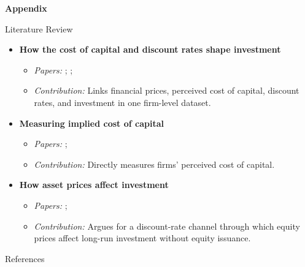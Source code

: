 \documentclass[aspectratio=169]{beamer}
\begin{document}
\appendix

\begin{frame}
    \centering
    \vfill
    {\Huge\bfseries Appendix}
    \vfill
\end{frame}

\begin{frame}{Literature Review}
    \begin{itemize}
        \item \textbf{How the cost of capital and discount rates shape investment}
        \begin{itemize}
            \item \textit{Papers:} \citet{jorgenson-1963}; \citet{tobin-1969}; \citet{hall-2017}
            \item \textit{Contribution:} Links financial prices, perceived cost of capital, discount rates, and investment in one firm-level dataset.
        \end{itemize}

        \vspace{0.25cm}
        \item \textbf{Measuring implied cost of capital}
        \begin{itemize}
            \item \textit{Papers:} \citet{fama-french-1997}; \citet{easton-2004}
            \item \textit{Contribution:} Directly measures firms' perceived cost of capital.
        \end{itemize}

        \vspace{0.25cm}
        \item \textbf{How asset prices affect investment}
        \begin{itemize}
            \item \textit{Papers:} \citet{bond-edmans-goldstein-2012}; \citet{baker-stein-wurgler-2003}
            \item \textit{Contribution:} Argues for a discount-rate channel through which equity prices affect long-run investment without equity issuance.
        \end{itemize}
    \end{itemize}
\end{frame}

\begin{frame}{References}
    \scriptsize
    \nocite{gormsen-huber-2025}
    
    
\end{frame}
\end{document}
